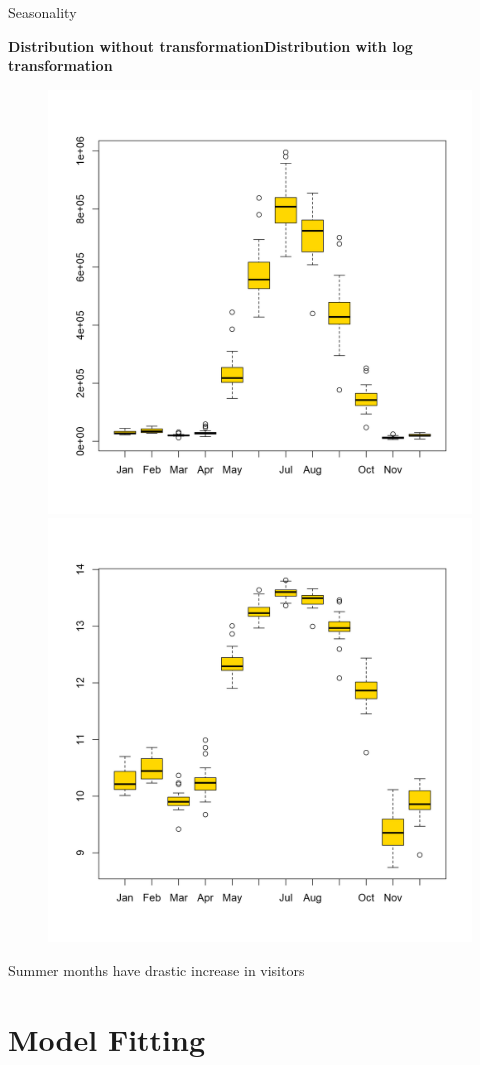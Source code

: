 \documentclass[xcolor=dvipsnames]{beamer}
\begin{document}
\begin{frame}{Seasonality}

\small{\textbf{Distribution without transformation}\hfill \textbf{Distribution with log transformation}}
\vspace{-1em}
\begin{figure}
\centering\includegraphics[width=.47\linewidth]{../normalplots/visits-distribution-plot.png} \hfill \centering\includegraphics[width=.47\linewidth]{../normalplots/logvisits-distribution-plot.png}
\end{figure}

\vfill 
\footnotesize Summer months have drastic increase in visitors


\end{frame}

\section{Model Fitting}
\subsection{}
\end{document}
